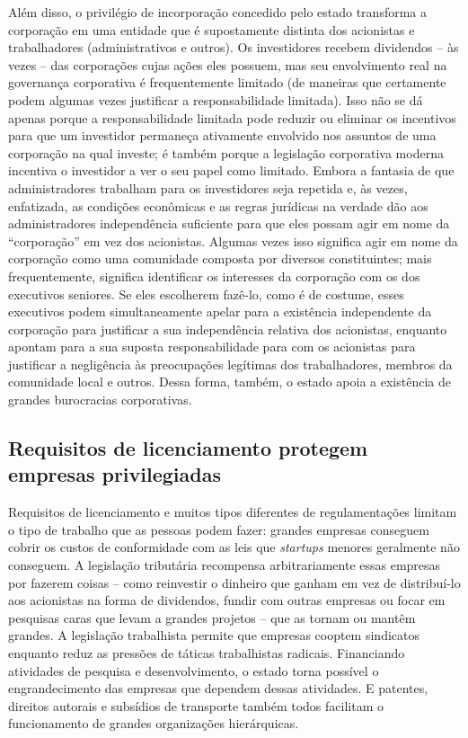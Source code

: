 Além disso, o privilégio de incorporação concedido pelo estado transforma a corporação em uma entidade que é supostamente distinta dos acionistas e trabalhadores (administrativos e outros). Os investidores recebem dividendos -- às vezes -- das corporações cujas ações eles possuem, mas seu envolvimento real na governança corporativa é frequentemente limitado (de maneiras que certamente podem algumas vezes justificar a responsabilidade limitada). Isso não se dá apenas porque a responsabilidade limitada pode reduzir ou eliminar os incentivos para que um investidor permaneça ativamente envolvido nos assuntos de uma corporação na qual investe; é também porque a legislação corporativa moderna incentiva o investidor a ver o seu papel como limitado. Embora a fantasia de que administradores trabalham para os investidores seja repetida e, às vezes, enfatizada, as condições econômicas e as regras jurídicas na verdade dão aos administradores independência suficiente para que eles possam agir em nome da ``corporação'' em vez dos acionistas. Algumas vezes isso significa agir em nome da corporação como uma comunidade composta por diversos constituintes; mais frequentemente, significa identificar os interesses da corporação com os dos executivos seniores. Se eles escolherem fazê-lo, como é de costume, esses executivos podem simultaneamente apelar para a existência independente da corporação para justificar a sua independência relativa dos acionistas, enquanto apontam para a sua suposta responsabilidade para com os acionistas para justificar a negligência às preocupações legítimas dos trabalhadores, membros da comunidade local e outros. Dessa forma, também, o estado apoia a existência de grandes burocracias corporativas.

\subsection*{Requisitos de licenciamento protegem empresas privilegiadas}

Requisitos de licenciamento e muitos tipos diferentes de regulamentações limitam o tipo de trabalho que as pessoas podem fazer: grandes empresas conseguem cobrir os custos de conformidade com as leis que \emph{startups} menores geralmente não conseguem. A legislação tributária recompensa arbitrariamente essas empresas por fazerem coisas -- como reinvestir o dinheiro que ganham em vez de distribuí-lo aos acionistas na forma de dividendos, fundir com outras empresas ou focar em pesquisas caras que levam a grandes projetos -- que as tornam ou mantêm grandes. A legislação trabalhista permite que empresas cooptem sindicatos enquanto reduz as pressões de táticas trabalhistas radicais. Financiando atividades de pesquisa e desenvolvimento, o estado torna possível o engrandecimento das empresas que dependem dessas atividades. E patentes, direitos autorais e subsídios de transporte também todos facilitam o funcionamento de grandes organizações hierárquicas.

